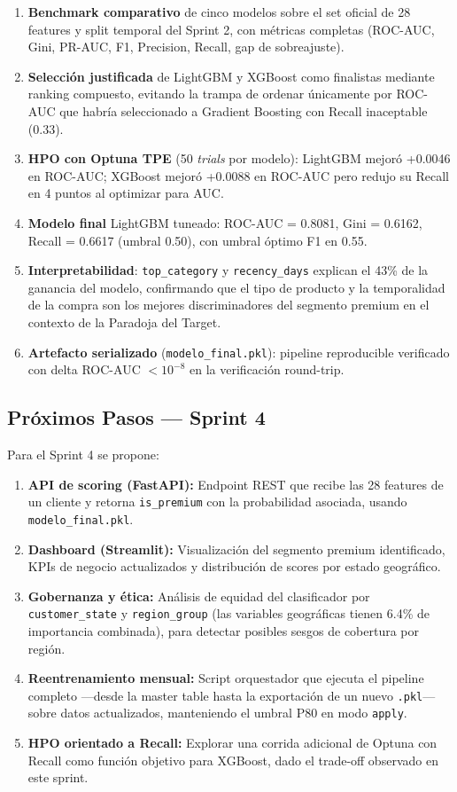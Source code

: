 \documentclass[journal,letterpaper]{IEEEtran}
\begin{document}
\begin{enumerate}
    \item \textbf{Benchmark comparativo} de cinco modelos sobre el set oficial de 28 features y split temporal del Sprint 2, con métricas completas (ROC-AUC, Gini, PR-AUC, F1, Precision, Recall, gap de sobreajuste).
    \item \textbf{Selección justificada} de LightGBM y XGBoost como finalistas mediante ranking compuesto, evitando la trampa de ordenar únicamente por ROC-AUC que habría seleccionado a Gradient Boosting con Recall inaceptable (0.33).
    \item \textbf{HPO con Optuna TPE} (50 \textit{trials} por modelo): LightGBM mejoró +0.0046 en ROC-AUC; XGBoost mejoró +0.0088 en ROC-AUC pero redujo su Recall en 4 puntos al optimizar para AUC.
    \item \textbf{Modelo final} LightGBM tuneado: ROC-AUC = 0.8081, Gini = 0.6162, Recall = 0.6617 (umbral 0.50), con umbral óptimo F1 en 0.55.
    \item \textbf{Interpretabilidad}: \texttt{top\_category} y \texttt{recency\_days} explican el 43\% de la ganancia del modelo, confirmando que el tipo de producto y la temporalidad de la compra son los mejores discriminadores del segmento premium en el contexto de la Paradoja del Target.
    \item \textbf{Artefacto serializado} (\texttt{modelo\_final.pkl}): pipeline reproducible verificado con delta ROC-AUC $< 10^{-8}$ en la verificación round-trip.
\end{enumerate}

\subsection{Próximos Pasos — Sprint 4}
Para el Sprint 4 se propone:
\begin{enumerate}
    \item \textbf{API de scoring (FastAPI):} Endpoint REST que recibe las 28 features de un cliente y retorna \texttt{is\_premium} con la probabilidad asociada, usando \texttt{modelo\_final.pkl}.
    \item \textbf{Dashboard (Streamlit):} Visualización del segmento premium identificado, KPIs de negocio actualizados y distribución de scores por estado geográfico.
    \item \textbf{Gobernanza y ética:} Análisis de equidad del clasificador por \texttt{customer\_state} y \texttt{region\_group} (las variables geográficas tienen 6.4\% de importancia combinada), para detectar posibles sesgos de cobertura por región.
    \item \textbf{Reentrenamiento mensual:} Script orquestador que ejecuta el pipeline completo —desde la master table hasta la exportación de un nuevo \texttt{.pkl}— sobre datos actualizados, manteniendo el umbral P80 en modo \texttt{apply}.
    \item \textbf{HPO orientado a Recall:} Explorar una corrida adicional de Optuna con Recall como función objetivo para XGBoost, dado el trade-off observado en este sprint.
\end{enumerate}
\end{document}
